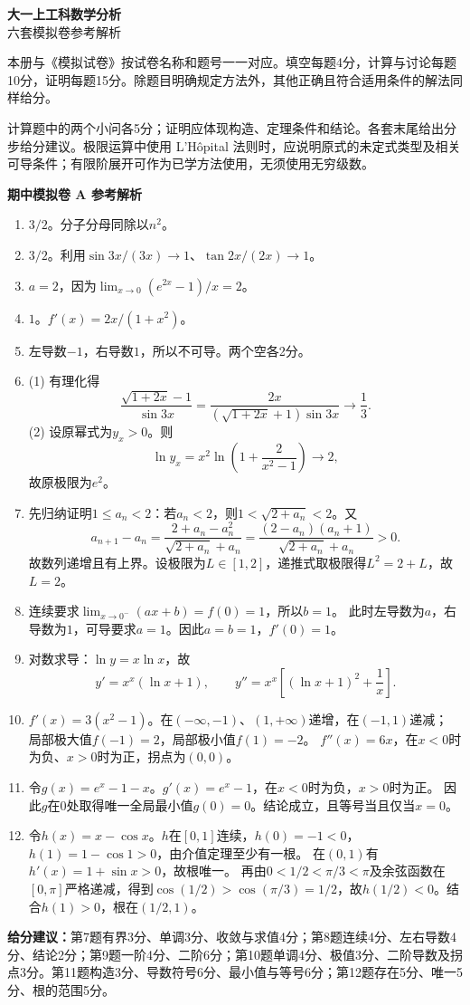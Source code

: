 \documentclass[11pt,a4paper,fontset=fandol]{ctexart}
\newcommand{\answerpaper}[1]{\clearpage\begin{center}{\LARGE\bfseries #1}\end{center}}
\begin{document}
\begin{center}
{\Huge\bfseries 大一上工科数学分析}\\[8mm]
{\LARGE 六套模拟卷参考解析}
\end{center}
\vspace{8mm}
本册与《模拟试卷》按试卷名称和题号一一对应。填空每题4分，计算与讨论每题10分，证明每题15分。除题目明确规定方法外，其他正确且符合适用条件的解法同样给分。

计算题中的两个小问各5分；证明应体现构造、定理条件和结论。各套末尾给出分步给分建议。极限运算中使用 L'Hôpital 法则时，应说明原式的未定式类型及相关可导条件；有限阶展开可作为已学方法使用，无须使用无穷级数。

\answerpaper{期中模拟卷 A 参考解析}
\begin{enumerate}
\item $3/2$。分子分母同除以$n^2$。
\item $3/2$。利用$\sin3x/(3x)\to1$、$\tan2x/(2x)\to1$。
\item $a=2$，因为$\lim_{x\to0}(e^{2x}-1)/x=2$。
\item $1$。$f'(x)=2x/(1+x^2)$。
\item 左导数$-1$，右导数$1$，所以不可导。两个空各2分。
\item (1) 有理化得
\[\frac{\sqrt{1+2x}-1}{\sin3x}
=\frac{2x}{(\sqrt{1+2x}+1)\sin3x}\longrightarrow\frac13.\]
(2) 设原幂式为$y_x>0$。则
\[\ln y_x=x^2\ln\left(1+\frac2{x^2-1}\right)\longrightarrow2,\]
故原极限为$e^2$。
\item 先归纳证明$1\le a_n<2$：若$a_n<2$，则$1<\sqrt{2+a_n}<2$。又
\[a_{n+1}-a_n=\frac{2+a_n-a_n^2}{\sqrt{2+a_n}+a_n}
=\frac{(2-a_n)(a_n+1)}{\sqrt{2+a_n}+a_n}>0.\]
故数列递增且有上界。设极限为$L\in[1,2]$，递推式取极限得$L^2=2+L$，故$L=2$。
\item 连续要求$\lim_{x\to0^-}(ax+b)=f(0)=1$，所以$b=1$。
此时左导数为$a$，右导数为$1$，可导要求$a=1$。因此$a=b=1$，$f'(0)=1$。
\item 对数求导：$\ln y=x\ln x$，故
\[y'=x^x(\ln x+1),\qquad
y''=x^x\left[(\ln x+1)^2+\frac1x\right].\]
\item $f'(x)=3(x^2-1)$。在$(-\infty,-1)$、$(1,+\infty)$递增，在$(-1,1)$递减；
局部极大值$f(-1)=2$，局部极小值$f(1)=-2$。
$f''(x)=6x$，在$x<0$时为负、$x>0$时为正，拐点为$(0,0)$。
\item 令$g(x)=e^x-1-x$。$g'(x)=e^x-1$，在$x<0$时为负，$x>0$时为正。
因此$g$在$0$处取得唯一全局最小值$g(0)=0$。结论成立，且等号当且仅当$x=0$。
\item 令$h(x)=x-\cos x$。$h$在$[0,1]$连续，$h(0)=-1<0$，$h(1)=1-\cos1>0$，由介值定理至少有一根。
在$(0,1)$有$h'(x)=1+\sin x>0$，故根唯一。
再由$0<1/2<\pi/3<\pi$及余弦函数在$[0,\pi]$严格递减，得到$\cos(1/2)>\cos(\pi/3)=1/2$，故$h(1/2)<0$。结合$h(1)>0$，根在$(1/2,1)$。
\end{enumerate}
\textbf{给分建议：}第7题有界3分、单调3分、收敛与求值4分；第8题连续4分、左右导数4分、结论2分；第9题一阶4分、二阶6分；第10题单调4分、极值3分、二阶导数及拐点3分。第11题构造3分、导数符号6分、最小值与等号6分；第12题存在5分、唯一5分、根的范围5分。
\end{document}
